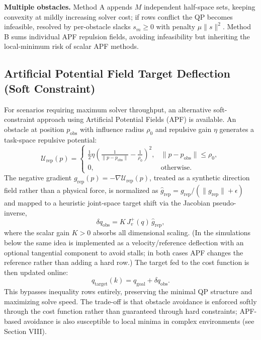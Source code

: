 \textbf{Multiple obstacles.} Method A appends \(M\) independent half-space
sets, keeping convexity at mildly increasing solver cost; if rows conflict
the QP becomes infeasible, resolved by per-obstacle slacks \(s_m \geq 0\)
with penalty \(\mu \|s\|^2\). Method B sums individual APF repulsion
fields, avoiding infeasibility but inheriting the local-minimum risk of
scalar APF methods.

\subsection{Artificial Potential Field Target Deflection (Soft
Constraint)}\label{b.-artificial-potential-field-target-deflection-soft-constraint}

For scenarios requiring maximum solver throughput, an alternative
soft-constraint approach using Artificial Potential Fields (APF) \cite{khatib1986}
is available. An obstacle at position \(p_{\text{obs}}\) with influence
radius \(\rho_0\) and repulsive gain \(\eta\) generates a task-space
repulsive potential:
\begin{equation}
\label{eq:apf-potential}
\mathcal{U}_{\text{rep}}(p) =
\begin{cases}
\frac{1}{2} \eta
\left(\frac{1}{\|p - p_{\text{obs}}\|} - \frac{1}{\rho_0}\right)^2,
& \|p - p_{\text{obs}}\| \leq \rho_0,\\
0, & \text{otherwise}.
\end{cases}
\end{equation}
The negative gradient
\(g_{\text{rep}}(p)=-\nabla \mathcal{U}_{\text{rep}}(p)\), treated as a
synthetic direction field rather than a physical force, is normalized as
\(\hat{g}_{\text{rep}}=g_{\text{rep}}/(\|g_{\text{rep}}\|+\epsilon)\) and
mapped to a heuristic joint-space target shift via the Jacobian
pseudo-inverse,
\begin{equation}
\label{eq:apf-target-shift}
\delta q_{\text{obs}} = K \, J_v^+(q) \, \hat{g}_{\text{rep}},
\end{equation}
where the scalar gain \(K > 0\) absorbs all dimensional scaling. (In the
simulations below the same idea is implemented as a velocity/reference
deflection with an optional tangential component to avoid stalls; in both
cases APF changes the reference rather than adding a hard row.) The target
fed to the cost function is then updated online:
\begin{equation}
\label{eq:apf-target}
q_{\text{target}}(k) = q_{\text{goal}} + \delta q_{\text{obs}} .
\end{equation}
This bypasses inequality rows entirely, preserving the minimal QP
structure and maximizing solve speed. The trade-off is that obstacle
avoidance is enforced softly through the cost function rather than
guaranteed through hard constraints; APF-based avoidance is also
susceptible to local minima in complex environments (see Section VIII).

